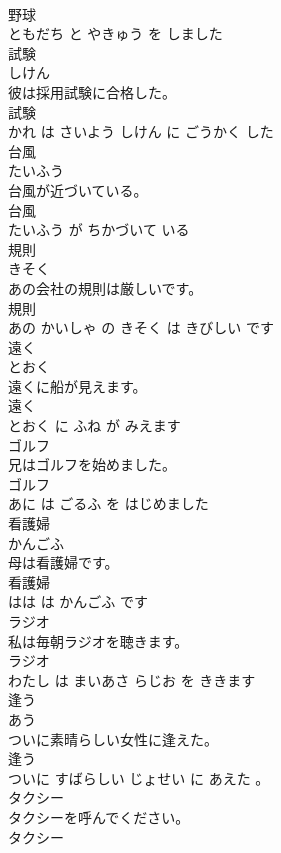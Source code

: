 \documentclass[8pt]{extreport}
\begin{document}
\begin{CJK}{UTF8}{min}
\\	野球 
\\	ともだち と やきゅう を しました			
\\	試験	
\\	しけん			
\\	彼は採用試験に合格した。	
\\	試験 
\\	かれ は さいよう しけん に ごうかく した			
\\	台風	
\\	たいふう			
\\	台風が近づいている。	
\\	台風 
\\	たいふう が ちかづいて いる			
\\	規則	
\\	きそく			
\\	あの会社の規則は厳しいです。	
\\	規則 
\\	あの かいしゃ の きそく は きびしい です			
\\	遠く	
\\	とおく			
\\	遠くに船が見えます。	
\\	遠く 
\\	とおく に ふね が みえます			
\\	ゴルフ	
\\	兄はゴルフを始めました。	
\\	ゴルフ 
\\	あに は ごるふ を はじめました			
\\	看護婦	
\\	かんごふ			
\\	母は看護婦です。	
\\	看護婦 
\\	はは は かんごふ です			
\\	ラジオ	
\\	私は毎朝ラジオを聴きます。	
\\	ラジオ 
\\	わたし は まいあさ らじお を ききます			
\\	逢う	
\\	あう			
\\	ついに素晴らしい女性に逢えた。	
\\	逢う 
\\	ついに すばらしい じょせい に あえた 。			
\\	タクシー	
\\	タクシーを呼んでください。	
\\	タクシー 

\end{CJK}
\end{document}
